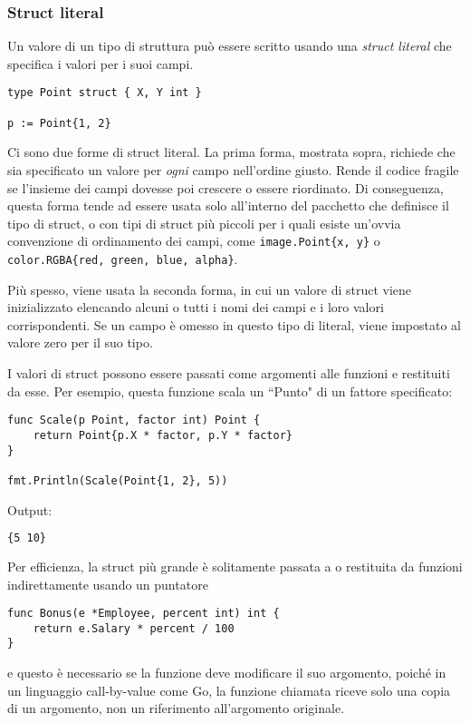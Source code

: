 \documentclass[../../../thesis.tex]{subfiles}
\begin{document}
    \subsubsection{Struct literal}
    Un valore di un tipo di struttura può essere scritto usando una \textit{struct literal} che specifica i valori per i suoi campi.
    \begin{lstlisting}[frame = single, label = {lst:lstlisting3-4-1.1}]
type Point struct { X, Y int }

p := Point{1, 2}
    \end{lstlisting}
    Ci sono due forme di struct literal.
    La prima forma, mostrata sopra, richiede che sia specificato un valore per \textit{ogni} campo nell'ordine giusto.
    Rende il codice fragile se l'insieme dei campi dovesse poi crescere o essere riordinato.
    Di conseguenza, questa forma tende ad essere usata solo all'interno del pacchetto che definisce il tipo di struct, o con tipi di struct più piccoli per i quali esiste un'ovvia convenzione di ordinamento dei campi, come \verb"image.Point{x, y}" o \verb"color.RGBA{red, green, blue, alpha}".
    \hfill \vspace{12pt}

    Più spesso, viene usata la seconda forma, in cui un valore di struct viene inizializzato elencando alcuni o tutti i nomi dei campi e i loro valori corrispondenti.
    Se un campo è omesso in questo tipo di literal, viene impostato al valore zero per il suo tipo.
    \hfill \vspace{12pt}

    I valori di struct possono essere passati come argomenti alle funzioni e restituiti da esse.
    Per esempio, questa funzione scala un ``Punto" di un fattore specificato:
    \begin{lstlisting}[frame = single, label = {lst:lstlisting3-4-1.2}]
func Scale(p Point, factor int) Point {
    return Point{p.X * factor, p.Y * factor}
}

fmt.Println(Scale(Point{1, 2}, 5))
    \end{lstlisting}
    Output:
    \begin{lstlisting}[language = bash, frame = L, label = {lst:lstlisting3-4-1.3}]
{5 10}
    \end{lstlisting}
    Per efficienza, la struct più grande è solitamente passata a o restituita da funzioni indirettamente usando un puntatore
    \begin{lstlisting}[frame = single, label = {lst:lstlisting3-4-1.4}]
func Bonus(e *Employee, percent int) int {
    return e.Salary * percent / 100
}
    \end{lstlisting}
    e questo è necessario se la funzione deve modificare il suo argomento, poiché in un linguaggio call-by-value come Go, la funzione chiamata riceve solo una copia di un argomento, non un riferimento all'argomento originale.
\end{document}

